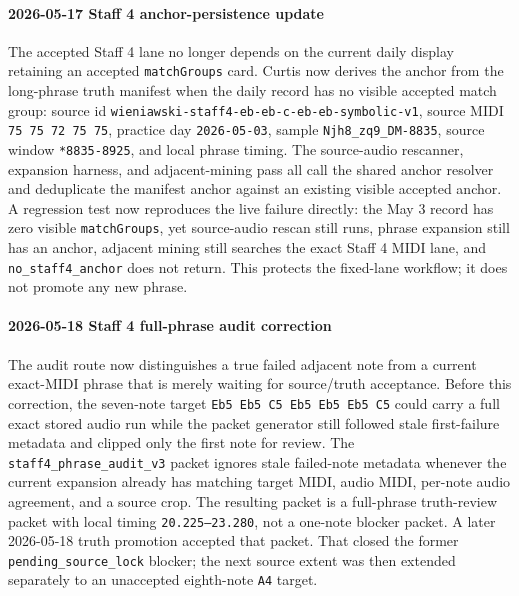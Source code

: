 \paragraph{2026-05-17 Staff 4 anchor-persistence update} The accepted Staff 4 lane no longer depends on the current daily display retaining an accepted \texttt{matchGroups} card. Curtis now derives the anchor from the long-phrase truth manifest when the daily record has no visible accepted match group: source id \texttt{wieniawski-staff4-eb-eb-c-eb-eb-symbolic-v1}, source MIDI \texttt{75 75 72 75 75}, practice day \texttt{2026-05-03}, sample \texttt{Njh8\_zq9\_DM-8835}, source window \texttt{*8835-8925}, and local phrase timing. The source-audio rescanner, expansion harness, and adjacent-mining pass all call the shared anchor resolver and deduplicate the manifest anchor against an existing visible accepted anchor. A regression test now reproduces the live failure directly: the May 3 record has zero visible \texttt{matchGroups}, yet source-audio rescan still runs, phrase expansion still has an anchor, adjacent mining still searches the exact Staff 4 MIDI lane, and \texttt{no\_staff4\_anchor} does not return. This protects the fixed-lane workflow; it does not promote any new phrase.

\paragraph{2026-05-18 Staff 4 full-phrase audit correction} The audit route now distinguishes a true failed adjacent note from a current exact-MIDI phrase that is merely waiting for source/truth acceptance. Before this correction, the seven-note target \texttt{Eb5 Eb5 C5 Eb5 Eb5 Eb5 C5} could carry a full exact stored audio run while the packet generator still followed stale first-failure metadata and clipped only the first note for review. The \texttt{staff4\_phrase\_audit\_v3} packet ignores stale failed-note metadata whenever the current expansion already has matching target MIDI, audio MIDI, per-note audio agreement, and a source crop. The resulting packet is a full-phrase truth-review packet with local timing \texttt{20.225--23.280}, not a one-note blocker packet. A later 2026-05-18 truth promotion accepted that packet. That closed the former \texttt{pending\_source\_lock} blocker; the next source extent was then extended separately to an unaccepted eighth-note \texttt{A4} target.

